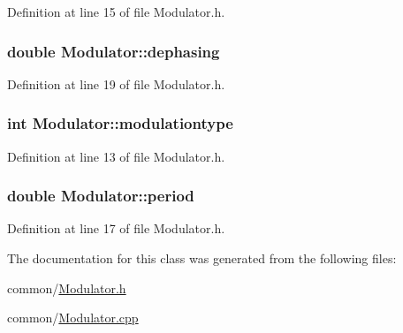 Definition at line 15 of file Modulator.h.

\hypertarget{classModulator_aa24a21030bcf630c28a63506e07e3f3a}{
\subsubsection[{dephasing}]{\setlength{\rightskip}{0pt plus 5cm}double {\bf Modulator::dephasing}}}
\label{classModulator_aa24a21030bcf630c28a63506e07e3f3a}


Definition at line 19 of file Modulator.h.

\hypertarget{classModulator_a86625d01ba4ca81cb15fd212c4fa72a8}{
\subsubsection[{modulationtype}]{\setlength{\rightskip}{0pt plus 5cm}int {\bf Modulator::modulationtype}}}
\label{classModulator_a86625d01ba4ca81cb15fd212c4fa72a8}


Definition at line 13 of file Modulator.h.

\hypertarget{classModulator_af9a5cbb6681a9493f97ad0a2104b883f}{
\subsubsection[{period}]{\setlength{\rightskip}{0pt plus 5cm}double {\bf Modulator::period}}}
\label{classModulator_af9a5cbb6681a9493f97ad0a2104b883f}


Definition at line 17 of file Modulator.h.



The documentation for this class was generated from the following files:\begin{DoxyCompactItemize}
\item 
common/\hyperlink{Modulator_8h}{Modulator.h}\item 
common/\hyperlink{Modulator_8cpp}{Modulator.cpp}\end{DoxyCompactItemize}
